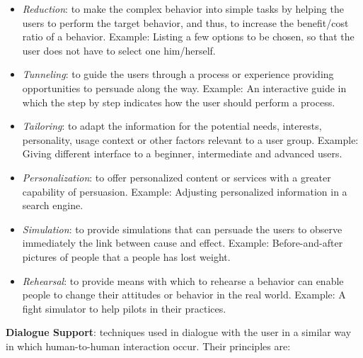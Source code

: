 \begin{itemize}
\item \emph{Reduction}: to make the complex behavior into simple tasks by helping the users to perform the target behavior, and thus, to increase the benefit/cost ratio of a behavior.
Example: Listing a few options to be chosen, so that the user does not have to select one him/herself.
\item \emph{Tunneling}: to guide the users through a process or experience providing opportunities to persuade along the way.
Example: An interactive guide in which the step by step indicates how the user should perform a process.
\item \emph{Tailoring}: to adapt the information for the potential needs, interests, personality, usage context or other factors relevant to a user group.
Example: Giving different interface to a beginner, intermediate and advanced users.
\item \emph{Personalization}: to offer personalized content or services with a greater capability of persuasion.
Example: Adjusting personalized information in a search engine.

\item \emph{Simulation}: to provide simulations that can persuade the users to observe immediately the link between cause and effect.
Example: Before-and-after pictures of people that a people has lost weight.
\item \emph{Rehearsal}: to provide means with which to rehearse a behavior can enable people to change their attitudes or behavior in the real world.
Example: A fight simulator to help pilots in their practices.
\end{itemize}

\textbf{Dialogue Support}: techniques used in dialogue with the user in a similar way in which human-to-human interaction occur. Their principles are:

